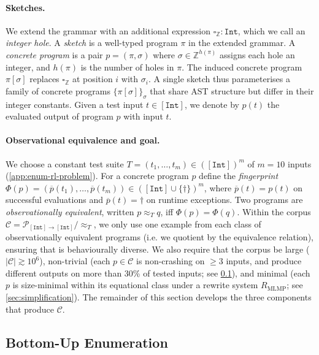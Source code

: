\documentclass[12pt]{article}
\begin{document}
\paragraph{Sketches.} We extend the grammar with an additional expression $\square_{\mathbb{Z}} : \texttt{Int}$, which we call an \emph{integer hole}. A \emph{sketch} is a well-typed program $\pi$ in the extended grammar. A \emph{concrete program} is a pair $p =(\pi, \sigma)$ where $\sigma \in \mathbb{Z}^{h(\pi)}$ assigns each hole an integer, and $h(\pi)$ is the number of holes in $\pi$. The induced concrete program $\pi[\sigma]$ replaces $\square_{\mathbb{Z}}$ at position $i$ with $\sigma_i$. A single sketch thus parameterises a family of concrete programs $\{\pi[\sigma]\}_\sigma$ that share AST structure but differ in their integer constants. Given a test input $t \in [\texttt{Int}]$, we denote by $p(t)$ the evaluated output of program $p$ with input $t$.

\paragraph{Observational equivalence and goal.} We choose a constant test suite $T = (t_1, \ldots, t_m) \in ([\texttt{Int}])^m$ of $m = 10$ inputs (\cref{app:enum-rl-problem}). For a concrete program $p$ define the \emph{fingerprint} $\Phi(p) = (\overline{p}(t_1), \ldots, \overline{p}(t_m)) \in ([\texttt{Int}] \cup \{\dagger\})^m$, where $\overline{p}(t) = p(t)$ on successful evaluations and $\overline{p}(t) = \dagger$ on runtime exceptions. Two programs are \emph{observationally equivalent}, written $p \approx_T q$, iff $\Phi(p) = \Phi(q)$. Within the corpus $\mathcal{C} = \mathcal{P}_{[\texttt{Int}] \to [\texttt{Int}]} / \approx_T$, we only use one example from each class of observationally equivalent programs (i.e. we quotient by the equivalence relation), ensuring that is behaviourally diverse. We also require that the corpus be large ($|\mathcal{C}| \gtrsim 10^6$), non-trivial (each $p \in \mathcal{C}$ is non-crashing on $\geq 3$ inputs, and produce different outputs on more than 30\% of tested inputs; see \cref{sec:enum-bottomup}), and minimal (each $p$ is size-minimal within its equational class under a rewrite system $R_{\text{MLMP}}$; see \cref{sec:simplification}). The remainder of this section develops the three components that produce $\mathcal{C}$.

\subsection{Bottom-Up Enumeration}
\label{sec:enum-bottomup}
\end{document}
